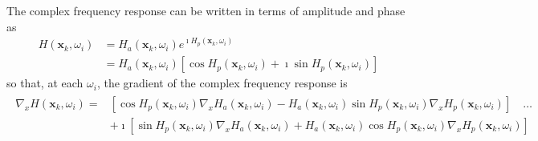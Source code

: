 \documentclass[a4paper,twoside,10pt,english]{report}
\begin{document}
The complex frequency response can be written in terms of amplitude and phase as
\begin{align*}
H\left(\boldsymbol{x}_{k},\omega_{i}\right) &= 
H_{a}\left(\boldsymbol{x}_{k},\omega_{i}\right)
e^{\imath H_{p}\left(\boldsymbol{x}_{k},\omega_{i}\right)}\\
&= H_{a}\left(\boldsymbol{x}_{k},\omega_{i}\right) \left[
\cos H_{p}\left(\boldsymbol{x}_{k},\omega_{i}\right) +
\imath \sin H_{p}\left(\boldsymbol{x}_{k},\omega_{i}\right) \right]
\end{align*}
so that, at each $\omega_{i}$, the gradient of the complex frequency response is
\begin{align*}
\begin{split}
\nabla_{x}H\left(\boldsymbol{x}_{k},\omega_{i}\right) =
&\left[ \cos H_{p}\left(\boldsymbol{x}_{k},\omega_{i}\right) 
\nabla_{x}H_{a}\left(\boldsymbol{x}_{k},\omega_{i}\right) -
H_{a}\left(\boldsymbol{x}_{k},\omega_{i}\right) 
\sin H_{p}\left(\boldsymbol{x}_{k},\omega_{i}\right) 
\nabla_{x}H_{p}\left(\boldsymbol{x}_{k},\omega_{i}\right) \right]
\quad \dots\\
& +\imath\left[ \sin H_{p}\left(\boldsymbol{x}_{k},\omega_{i}\right) 
\nabla_{x}H_{a}\left(\boldsymbol{x}_{k},\omega_{i}\right) +
H_{a}\left(\boldsymbol{x}_{k},\omega_{i}\right) 
\cos H_{p}\left(\boldsymbol{x}_{k},\omega_{i}\right) 
\nabla_{x}H_{p}\left(\boldsymbol{x}_{k},\omega_{i}\right) \right]
\end{split}
\end{align*}
\end{document}
